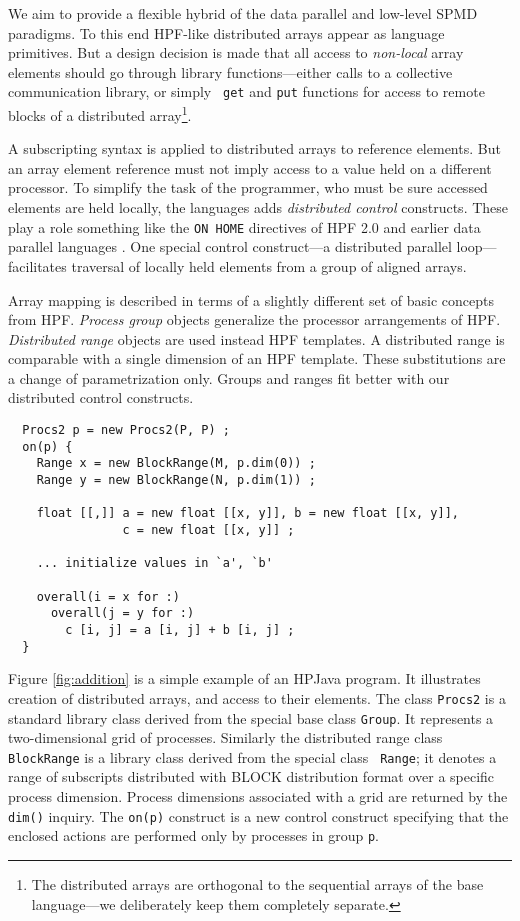 \documentclass{article}
\begin{document}
We aim to provide a flexible hybrid of the data parallel and low-level
SPMD paradigms.  To this end HPF-like distributed arrays appear as
language primitives.  But a design decision is made that all access to {\em
non-local} array elements should go through library functions---either
calls to a collective communication library, or simply {\tt
get} and {\tt put} functions for access to remote blocks of a
distributed array\footnote{The distributed arrays are orthogonal
to the sequential arrays of the base language---we deliberately
keep them completely separate.}.

A subscripting syntax is applied to distributed arrays to reference
elements.  But an array element reference must not imply access to a
value held on a different processor.  To simplify the task of the
programmer, who must be sure accessed elements are held locally, the
languages adds {\em distributed control} constructs.
These play a role something like the {\tt ON HOME} directives of HPF
2.0 and earlier data parallel languages \cite{Kali}.  One special
control construct---a distributed parallel loop---facilitates traversal
of locally held elements from a group of aligned arrays.

Array mapping is described in terms of a slightly different set of
basic concepts from HPF.  {\em Process group} objects generalize the
processor arrangements of HPF.  {\em Distributed range} objects are
used instead HPF templates.  A distributed range is comparable with a
single dimension of an HPF template.  These substitutions are a change
of parametrization only.  Groups and ranges fit better with our
distributed control constructs.

\begin{figure*}[tbp]
\small
\begin{verbatim}
  Procs2 p = new Procs2(P, P) ;
  on(p) {
    Range x = new BlockRange(M, p.dim(0)) ;
    Range y = new BlockRange(N, p.dim(1)) ;

    float [[,]] a = new float [[x, y]], b = new float [[x, y]],
                c = new float [[x, y]] ;

    ... initialize values in `a', `b'

    overall(i = x for :)
      overall(j = y for :)
        c [i, j] = a [i, j] + b [i, j] ;
  }
\end{verbatim}
\normalsize
\caption{A parallel matrix addition.\label{fig:addition}}
\end{figure*}

Figure \ref{fig:addition} is a simple example of an HPJava program.  It
illustrates creation of distributed arrays, and access to their
elements.  The class {\tt Procs2} is a standard library class derived
from the special base class {\tt Group}.  It represents a
two-dimensional grid of processes.  Similarly the distributed range class
{\tt BlockRange} is a library class derived from the special class {\tt
Range}; it denotes a range of subscripts distributed with
BLOCK distribution format over a specific process dimension.  Process
dimensions associated with a grid are returned by the {\tt dim()}
inquiry.
The {\tt on(p)} construct is a new control construct specifying that
the enclosed actions are performed only by processes in group {\tt p}.
\end{document}
